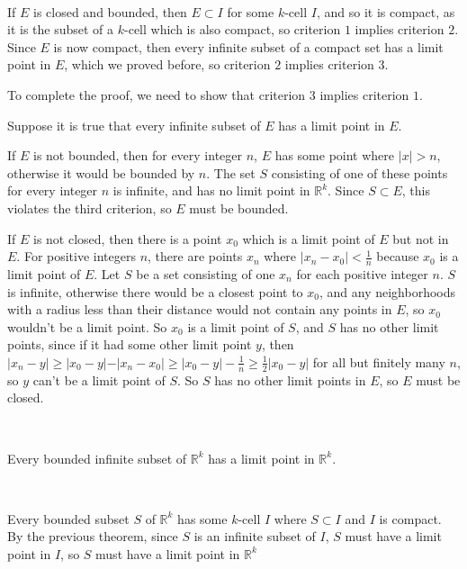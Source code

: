 \documentclass{article}
\begin{document}
\begin{customproof}
\

If $E$ is closed and bounded, then $E \subset I$ for some $k$-cell $I$, and so it is compact, as it is the subset of a $k$-cell which is also compact, so criterion $1$ implies criterion $2$. Since $E$ is now compact, then every infinite subset of a compact set has a limit point in $E$, which we proved before, so criterion $2$ implies criterion $3$.

To complete the proof, we need to show that criterion $3$ implies criterion $1$.

Suppose it is true that every infinite subset of $E$ has a limit point in $E$. 

If $E$ is not bounded, then for every integer $n$, $E$ has some point where $\vert x \vert > n$, otherwise it would be bounded by $n$. The set $S$ consisting of one of these points for every integer $n$ is infinite, and has no limit point in $\mathbb{R}^k$. Since $S \subset E$, this violates the third criterion, so $E$ must be bounded.

If $E$ is not closed, then there is a point $x_0$ which is a limit point of $E$ but not in $E$. For positive integers $n$, there are points $x_n$ where $\vert x_n - x_0 \vert < \frac{1}{n}$ because $x_0$ is a limit point of $E$. Let $S$ be a set consisting of one $x_n$ for each positive integer $n$. $S$ is infinite, otherwise there would be a closest point to $x_0$, and any neighborhoods with a radius less than their distance would not contain any points in $E$, so $x_0$ wouldn't be a limit point. So $x_0$ is a limit point of $S$, and $S$ has no other limit points, since if it had some other limit point $y$, then $\vert x_n - y \vert \geq \vert x_0 - y \vert - \vert x_n - x_0 \vert \geq \vert x_0 -y \vert - \frac{1}{n} \geq \frac{1}{2} \vert x_0 - y \vert$ for all but finitely many $n$, so $y$ can't be a limit point of $S$. So $S$ has no other limit points in $E$, so $E$ must be closed.
\end{customproof}

\begin{theorem}
\

Every bounded infinite subset of $\mathbb{R}^k$ has a limit point in $\mathbb{R}^k$.
\end{theorem}

\begin{customproof}
\

Every bounded subset $S$ of $\mathbb{R}^k$ has some $k$-cell $I$ where $S \subset I$ and $I$ is compact. By the previous theorem, since $S$ is an infinite subset of $I$, $S$ must have a limit point in $I$, so $S$ must have a limit point in $\mathbb{R}^k$
\end{customproof}
\end{document}

